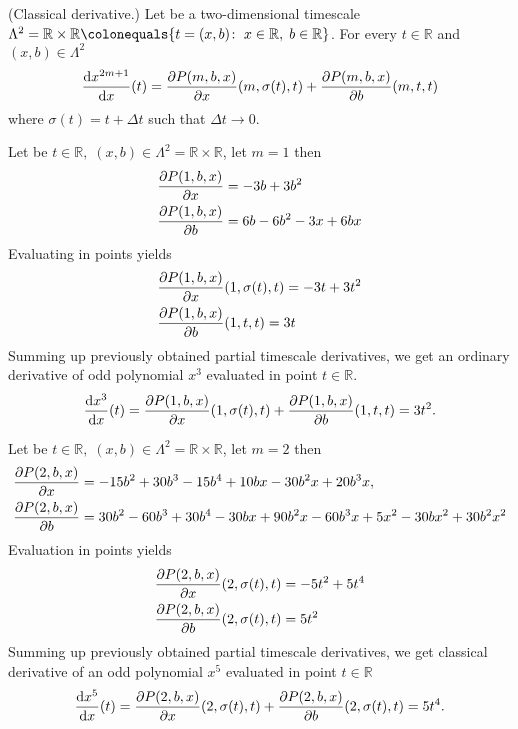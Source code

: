 \begin{cor}
    \label{derivative_case}
    (Classical derivative.)
    Let be a two-dimensional timescale
    $\Lambda^2 = \mathbb{R} \times \mathbb{R} \colonequals \{t=(x, b) \colon \; x\in \mathbb{R}, \; b\in\mathbb{R} \}$.
    For every $t\in\mathbb{R}$ and $(x,b) \in \Lambda^2$
    \begin{align*}
        \odv{x^{2m+1}}{x} (t)
        = \pdv{\polynomialP{m}{b}{x}}{x} (m, \sigma(t), t)
        + \pdv{\polynomialP{m}{b}{x}}{b} (m, t, t)
    \end{align*}
    where $\sigma(t) = t + \Delta t$ such that $ \Delta t \to 0.$
\end{cor}
\begin{examp}
    \label{time_scale_r_example_1}
    Let be $t\in\mathbb{R}, \; (x,b) \in \Lambda^2 = \mathbb{R} \times \mathbb{R}$, let $m=1$ then
    \begin{align*}
        \pdv{P ( 1, b, x )}{x} &= -3 b + 3 b^2 \\
        \pdv{P ( 1, b, x )}{b} &= 6 b - 6 b^2 - 3 x + 6 b x
    \end{align*}
    Evaluating in points yields
    \begin{align*}
        &\pdv{P ( 1, b, x )}{x} (1, \sigma(t), t) = -3t + 3t^2 \\
        &\pdv{P ( 1, b, x )}{b} (1, t, t) = 3t
    \end{align*}
    Summing up previously obtained partial timescale derivatives, we get an ordinary derivative of odd polynomial
    $x^{3}$ evaluated in point $t \in \mathbb{R}$.
    \begin{align*}
        \odv{x^3}{x} (t)
        = \pdv{\polynomialP{1}{b}{x}}{x} (1, \sigma(t), t)
        + \pdv{\polynomialP{1}{b}{x}}{b} (1, t, t)
        = 3t^2.
    \end{align*}
\end{examp}
\begin{examp}
    \label{time_scale_r_example_2}
    Let be $t\in\mathbb{R}, \; (x,b) \in \Lambda^2 = \mathbb{R} \times \mathbb{R}$, let $m=2$ then
    \begin{align*}
        &\pdv{P ( 2, b, x )}{x} = -15 b^2 + 30 b^3 - 15 b^4 + 10 b x - 30 b^2 x + 20 b^3 x, \\
        &\pdv{P ( 2, b, x )}{b} = 30 b^2 - 60 b^3 + 30 b^4 - 30 b x + 90 b^2 x - 60 b^3 x + 5 x^2 - 30 b x^2 + 30 b^2 x^2
    \end{align*}
    Evaluation in points yields
    \begin{align*}
        &\pdv{P ( 2, b, x )}{x} (2, \sigma(t), t) = -5 t^2 + 5 t^4 \\
        &\pdv{P ( 2, b, x )}{b} (2, \sigma(t), t)        = 5 t^2
    \end{align*}
    Summing up previously obtained partial timescale derivatives, we get classical derivative of an odd polynomial
    $x^5$ evaluated in point $t\in\mathbb{R}$
    \begin{align*}
        \odv{x^5}{x} (t)
        = \pdv{\polynomialP{2}{b}{x}}{x} (2, \sigma(t), t)
        + \pdv{\polynomialP{2}{b}{x}}{b} (2, \sigma(t), t)
        = 5t^4.
    \end{align*}
\end{examp}
